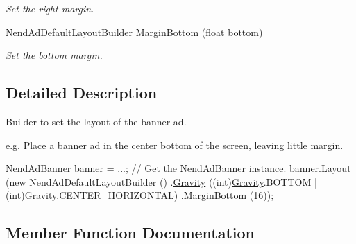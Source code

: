 \begin{DoxyCompactItemize}
\begin{DoxyCompactList}\small\item\em Set the right margin. \end{DoxyCompactList}\item 
\hyperlink{class_nend_unity_plugin_1_1_layout_1_1_nend_ad_default_layout_builder}{Nend\+Ad\+Default\+Layout\+Builder} \hyperlink{class_nend_unity_plugin_1_1_layout_1_1_nend_ad_default_layout_builder_a07e4461c0e38d29f524df81982833787}{Margin\+Bottom} (float bottom)
\begin{DoxyCompactList}\small\item\em Set the bottom margin. \end{DoxyCompactList}\end{DoxyCompactItemize}


\subsection{Detailed Description}
Builder to set the layout of the banner ad. 

e.\+g. Place a banner ad in the center bottom of the screen, leaving little margin. 
\begin{DoxyCode}
NendAdBanner banner = ...; \textcolor{comment}{// Get the NendAdBanner instance.}
banner.Layout (\textcolor{keyword}{new} NendAdDefaultLayoutBuilder ()
                .\hyperlink{class_nend_unity_plugin_1_1_layout_1_1_nend_ad_default_layout_builder_abebe8725e88408ea8c7ff349bdb2f3c1}{Gravity} ((\textcolor{keywordtype}{int})\hyperlink{class_nend_unity_plugin_1_1_layout_1_1_nend_ad_default_layout_builder_abebe8725e88408ea8c7ff349bdb2f3c1}{Gravity}.BOTTOM | (\textcolor{keywordtype}{int})\hyperlink{class_nend_unity_plugin_1_1_layout_1_1_nend_ad_default_layout_builder_abebe8725e88408ea8c7ff349bdb2f3c1}{Gravity}.CENTER\_HORIZONTAL)
                .\hyperlink{class_nend_unity_plugin_1_1_layout_1_1_nend_ad_default_layout_builder_a07e4461c0e38d29f524df81982833787}{MarginBottom} (16));
\end{DoxyCode}
 

\subsection{Member Function Documentation}
\hypertarget{class_nend_unity_plugin_1_1_layout_1_1_nend_ad_default_layout_builder_abebe8725e88408ea8c7ff349bdb2f3c1}{}
